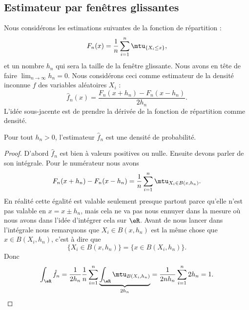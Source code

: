 \subsection{Estimateur par fenêtres glissantes}

Nous considérons les estimations suivantes de la fonction de répartition :
\begin{equation}
    F_n(x)=\frac{1}{ n }\sum_{i=1}^n\mtu_{\{ X_i\leq x \}},
\end{equation}
et un nombre \( h_n\) qui sera la taille de la fenêtre glissante. Nous avons en tête de faire \( \lim_{n\to \infty} h_n=0\). Nous considérons ceci comme estimateur de la densité inconnue \( f\) des variables aléatoires \( X_i\) :
\begin{equation}
    \hat f_n(x)=\frac{ F_n(x+h_n)-F_n(x-h_n) }{ 2h_n }.
\end{equation}
L'idée sous-jacente est de prendre la dérivée de la fonction de répartition comme densité.

\begin{lemma}
    Pour tout \( h_n>0\), l'estimateur \( \hat f_n\) est une densité de probabilité.
\end{lemma}

\begin{proof}
    D'abord \( \hat f_n\) est bien à valeurs positives ou nulle. Ensuite devons parler de son intégrale. Pour le numérateur nous avons
    \begin{equation}
        F_n(x+h_n)-F_n(x-h_n)=\frac{1}{ n }\sum_{i=1}^{n}\mtu_{X_i\in B(x,h_n)}.
    \end{equation}
    En réalité cette égalité est valable seulement presque partout parce qu'elle n'est pas valable en \( x=x\pm h_n\), mais cela ne va pas nous ennuyer dans la mesure où nous avons dans l'idée d'intégrer cela sur \( \eR\). Avant de nous lancer dans l'intégrale nous remarquons que \( X_i\in B(x,h_n)\) est la même chose que \( x\in B(X_i,h_n)\), c'est à dire que
    \begin{equation}
        \{ X_i\in B(x,h_n) \}=\{ x\in B(X_i,h_n) \}.
    \end{equation}
    Donc
    \begin{equation}
        \int_{\eR}\hat f_n=\frac{1}{ 2h_n }\frac{1}{ n }\sum_{i=1}^n\underbrace{\int_{\eR}\mtu_{B(X_i,h_n)}}_{2h_n}=\frac{1}{ 2nh_n }\sum_{i=1}^n2h_n=1.
    \end{equation}
\end{proof}

